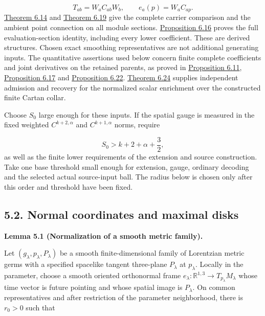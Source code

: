 \documentclass[
  english,
  11pt,
  reqno]{amsart}
\makeatletter
\newcommand{\pandocstatementheading}[1]{%
  \par\addpenalty{\@beginparpenalty}%
  \addvspace{.5\baselineskip plus .2\baselineskip minus .2\baselineskip}%
  {\normalfont\bfseries #1\par}%
  \nobreak\@afterindenttrue\@afterheading
}
\makeatother
\begin{document}
\label{eq:submission-wave-completion-interface} \[
T_{ab}=W_aC_{ab}W_b,\qquad
e_a(p)=W_aC_{ap}.
\] \hyperref[thm:online-wave-carrier-cocycle]{Theorem 6.14} and
\hyperref[thm:online-ambient-point-connection]{Theorem 6.19} give the
complete carrier comparison and the ambient point connection on all
module sections.
\hyperref[prop:online-wave-full-evaluation-comparison]{Proposition 6.16}
proves the full evaluation-section identity, including every lower
coefficient. These are derived structures. Chosen exact smoothing
representatives are not additional generating inputs. The quantitative
assertions used below concern finite complete coefficients and joint
derivatives on the retained parents, as proved in
\hyperref[prop:online-wave-kernel-finite-families]{Proposition 6.11},
\hyperref[prop:online-wave-carrier-families-scale]{Proposition 6.17} and
\hyperref[prop:online-point-connection-finite-families]{Proposition
6.22}. \hyperref[thm:online-wave-enrichment-recognition]{Theorem 6.24}
supplies independent admission and recovery for the normalized scalar
enrichment over the constructed finite Cartan collar.

Choose \(S_0\) large enough for these inputs. If the spatial gauge is
measured in the fixed weighted \(C^{k+2,\alpha}\) and \(C^{k+1,\alpha}\)
norms, require

\label{eq:submission-coverage-base-order} \[
S_0>k+2+\alpha+\frac32,
\] as well as the finite lower requirements of the extension and source
construction. Take one base threshold small enough for extension, gauge,
ordinary decoding and the selected actual source-input ball. The radius
below is chosen only after this order and threshold have been fixed.

\subsection{5.2. Normal coordinates and maximal
disks}\label{normal-coordinates-and-maximal-disks}\label{sec:submission-normalization}

\pandocstatementheading{\leavevmode{}\label{lem:submission-normal-coordinate-family}Lemma 5.1 (Normalization of a smooth metric family).}

Let \((g_\lambda,p_\lambda,P_\lambda)\) be a smooth finite-dimensional
family of Lorentzian metric germs with a specified spacelike tangent
three-plane \(P_\lambda\) at \(p_\lambda\). Locally in the parameter,
choose a smooth oriented orthonormal frame
\(e_\lambda:\mathbb R^{1,3}\to T_{p_\lambda}M_\lambda\) whose time
vector is future pointing and whose spatial image is \(P_\lambda\). On
common representatives and after restriction of the parameter
neighborhood, there is \(r_0>0\) such that
\end{document}
